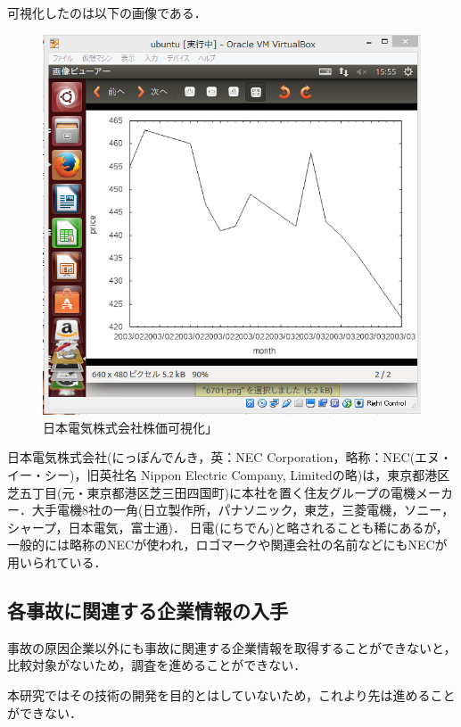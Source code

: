 {可視化したのは以下の画像である．

\begin{figure}[H]
\centering
\includegraphics[width=15cm]{6701.PNG}
\caption{日本電気株式会社株価可視化」}\label{サンプル図}
\end{figure}
日本電気株式会社(にっぽんでんき，英：NEC Corporation，略称：NEC(エヌ・イー・シー)，旧英社名 Nippon Electric Company, Limitedの略)は，東京都港区芝五丁目(元・東京都港区芝三田四国町)に本社を置く住友グループの電機メーカー．大手電機8社の一角(日立製作所，パナソニック，東芝，三菱電機，ソニー，シャープ，日本電気，富士通)．
日電(にちでん)と略されることも稀にあるが，一般的には略称のNECが使われ，ロゴマークや関連会社の名前などにもNECが用いられている\cite{nihondenki}．





\subsection{各事故に関連する企業情報の入手}

事故の原因企業以外にも事故に関連する企業情報を取得することができないと，
比較対象がないため，調査を進めることができない．

本研究ではその技術の開発を目的とはしていないため，これより先は進めることができない．



}
